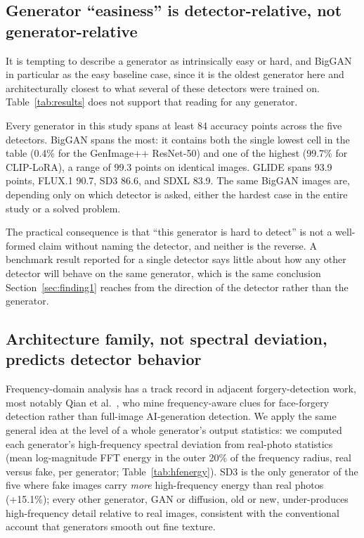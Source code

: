 \documentclass[3p,times,procedia]{elsarticle}
\begin{document}
\subsection{Generator ``easiness'' is detector-relative, not generator-relative}
\label{sec:finding3}

It is tempting to describe a generator as intrinsically easy or hard, and
BigGAN in particular as the easy baseline case, since it is the oldest
generator here and architecturally closest to what several of these
detectors were trained on. Table~\ref{tab:results} does not support that
reading for any generator.

Every generator in this study spans at least 84 accuracy points across the
five detectors. BigGAN spans the most: it contains both the single lowest
cell in the table (0.4\% for the GenImage++ ResNet-50) and one of the
highest (99.7\% for CLIP-LoRA), a range of 99.3 points on identical images.
GLIDE spans 93.9 points, FLUX.1 90.7, SD3 86.6, and SDXL 83.9. The same
BigGAN images are, depending only on which detector is asked, either the
hardest case in the entire study or a solved problem.

The practical consequence is that ``this generator is hard to detect'' is
not a well-formed claim without naming the detector, and neither is the
reverse. A benchmark result reported for a single detector says little
about how any other detector will behave on the same generator, which is
the same conclusion Section~\ref{sec:finding1} reaches from the direction
of the detector rather than the generator.

\subsection{Architecture family, not spectral deviation, predicts
detector behavior}

Frequency-domain analysis has a track record in adjacent forgery-detection
work, most notably Qian et al.~\cite{qian2020freq}, who mine
frequency-aware clues for face-forgery detection rather than full-image
AI-generation detection. We apply the same general idea at the level of a
whole generator's output statistics: we computed each generator's
high-frequency spectral deviation from real-photo statistics (mean
log-magnitude FFT energy in the outer 20\% of the frequency radius, real
versus fake, per generator; Table~\ref{tab:hfenergy}). SD3 is the only
generator of the five where fake images carry \emph{more} high-frequency
energy than real photos (+15.1\%);
every other generator, GAN or diffusion, old or new, under-produces
high-frequency detail relative to real images, consistent with the
conventional account that generators smooth out fine texture.
\end{document}
